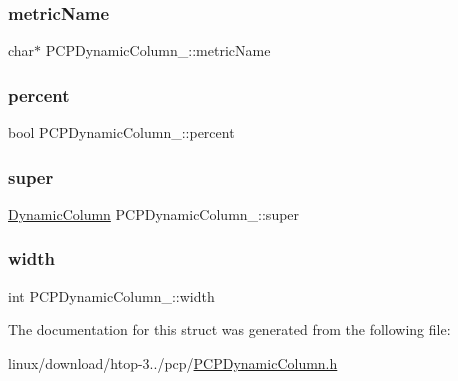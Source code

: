 \subsubsection{\texorpdfstring{metric\+Name}{metricName}}
{\footnotesize\ttfamily char$\ast$ P\+C\+P\+Dynamic\+Column\+\_\+\+::metric\+Name}

\mbox{\label{structPCPDynamicColumn___a9590f408cd6b0d3fe673c8315fad8d6d}} 
\subsubsection{\texorpdfstring{percent}{percent}}
{\footnotesize\ttfamily bool P\+C\+P\+Dynamic\+Column\+\_\+\+::percent}

\mbox{\label{structPCPDynamicColumn___a40bfe73b6c2828f5acdcc5b9962ec309}} 
\subsubsection{\texorpdfstring{super}{super}}
{\footnotesize\ttfamily \hyperlink{DynamicColumn_8h_ae58b8180abf67f1af86ba3d6976de501}{Dynamic\+Column} P\+C\+P\+Dynamic\+Column\+\_\+\+::super}

\mbox{\label{structPCPDynamicColumn___af622dfb7de7c3e7bebee8ae1fb68a319}} 
\subsubsection{\texorpdfstring{width}{width}}
{\footnotesize\ttfamily int P\+C\+P\+Dynamic\+Column\+\_\+\+::width}



The documentation for this struct was generated from the following file\+:\begin{DoxyCompactItemize}
\item 
linux/download/htop-\/3../pcp/\hyperlink{PCPDynamicColumn_8h}{P\+C\+P\+Dynamic\+Column.\+h}\end{DoxyCompactItemize}

